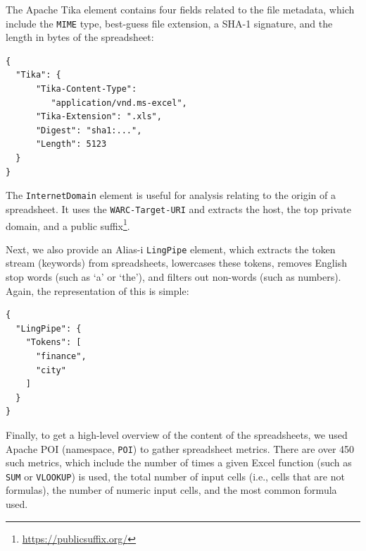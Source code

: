 \documentclass[conference]{IEEEtran}
\begin{document}
The Apache Tika element contains four fields related to the file metadata, which include the \texttt{MIME} type, best-guess file extension, a SHA-1 signature, and the length in bytes of the spreadsheet:

\begin{verbatim}
{
  "Tika": {
      "Tika-Content-Type": 
         "application/vnd.ms-excel",
      "Tika-Extension": ".xls",
      "Digest": "sha1:...",
      "Length": 5123
  }
}
\end{verbatim}

The \texttt{InternetDomain} element is useful for analysis relating to the origin of a spreadsheet. It uses the \texttt{WARC-Target-URI} and extracts the host, the top private domain, and a public suffix\footnote{\url{https://publicsuffix.org/}}.


Next, we also provide an Alias-i \texttt{LingPipe} element, which extracts the token stream (keywords) from spreadsheets, lowercases these tokens, removes English stop words (such as `a' or `the'), and filters out non-words (such as numbers). Again, the representation of this is simple:

\begin{verbatim}
{
  "LingPipe": {    
    "Tokens": [
      "finance",      
      "city"      
    ]
  }
}
\end{verbatim}

Finally, to get a high-level overview of the content of the spreadsheets, we used Apache POI (namespace, \texttt{POI}) to gather spreadsheet metrics. There are over 450 such metrics, which include the number of times a given Excel function (such as \texttt{SUM} or \texttt{VLOOKUP}) is used, the total number of input cells (i.e., cells that are not formulas), the number of numeric input cells, and the most common formula used.


\end{document}
